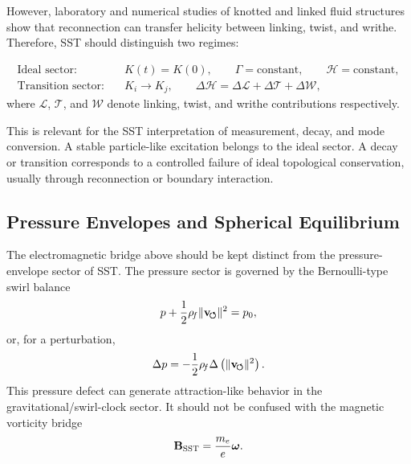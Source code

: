     However, laboratory and numerical studies of knotted and linked fluid
    structures show that reconnection can transfer helicity between linking,
    twist, and writhe.  Therefore, SST should distinguish two regimes:
    
    \begin{align}
        \text{Ideal sector:}
        \quad
        &K(t)=K(0),
        \qquad
        \Gamma=\text{constant},
        \qquad
        \mathcal{H}=\text{constant},
        \label{eq:ideal_topology_sector}
        \\
        \text{Transition sector:}
        \quad
        &K_i\rightarrow K_j,
        \qquad
        \Delta\mathcal{H}
        =
        \Delta\mathcal{L}
        +
        \Delta\mathcal{T}
        +
        \Delta\mathcal{W},
        \label{eq:transition_topology_sector}
    \end{align}
    where \(\mathcal{L}\), \(\mathcal{T}\), and \(\mathcal{W}\) denote
    linking, twist, and writhe contributions respectively.
    
    This is relevant for the SST interpretation of measurement, decay, and
    mode conversion.  A stable particle-like excitation belongs to the ideal
    sector.  A decay or transition corresponds to a controlled failure of
    ideal topological conservation, usually through reconnection or boundary
    interaction.

\subsection{Pressure Envelopes and Spherical Equilibrium}
    
    The electromagnetic bridge above should be kept distinct from the
    pressure-envelope sector of SST.  The pressure sector is governed by the
    Bernoulli-type swirl balance
    \begin{equation}
        p
        +
        \frac{1}{2}\rho_{\!f}\lVert\mathbf{v}_{\!\boldsymbol{\circlearrowleft}}\rVert^2
        =
        p_0,
        \label{eq:bernoulli_swirl_pressure}
    \end{equation}
    or, for a perturbation,
    \begin{equation}
        \Delta p
        =
        -
        \frac{1}{2}\rho_{\!f}
        \Delta\left(\lVert\mathbf{v}_{\!\boldsymbol{\circlearrowleft}}\rVert^2\right).
        \label{eq:pressure_defect}
    \end{equation}
    This pressure defect can generate attraction-like behavior in the
    gravitational/swirl-clock sector.  It should not be confused with the
    magnetic vorticity bridge
    \begin{equation}
        \mathbf{B}_{\rm SST}
        =
        \frac{m_e}{e}\boldsymbol{\omega}.
    \end{equation}
    
